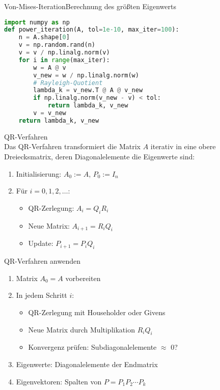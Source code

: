 \begin{example2}{Von-Mises-Iteration}{Berechnung des größten Eigenwerts}
\begin{lstlisting}[language=Python, style=basesmol]
import numpy as np
def power_iteration(A, tol=1e-10, max_iter=100):
    n = A.shape[0]
    v = np.random.rand(n)
    v = v / np.linalg.norm(v)
    for i in range(max_iter):
        w = A @ v
        v_new = w / np.linalg.norm(w)
        # Rayleigh-Quotient
        lambda_k = v_new.T @ A @ v_new
        if np.linalg.norm(v_new - v) < tol:
            return lambda_k, v_new
        v = v_new
    return lambda_k, v_new
\end{lstlisting}
\end{example2}

\begin{concept}{QR-Verfahren}\\
Das QR-Verfahren transformiert die Matrix $A$ iterativ in eine obere Dreiecksmatrix, deren Diagonalelemente die Eigenwerte sind:
\begin{enumerate}
    \item Initialisierung: $A_0 := A$, $P_0 := I_n$
    \item Für $i = 0,1,2,\ldots$:
    \begin{itemize}
        \item QR-Zerlegung: $A_i = Q_iR_i$
        \item Neue Matrix: $A_{i+1} = R_iQ_i$
        \item Update: $P_{i+1} = P_iQ_i$
    \end{itemize}
\end{enumerate}
\end{concept}

\begin{KR}{QR-Verfahren anwenden}
\begin{enumerate}
    \item Matrix $A_0 = A$ vorbereiten
    \item In jedem Schritt $i$:
    \begin{itemize}
        \item QR-Zerlegung mit Householder oder Givens
        \item Neue Matrix durch Multiplikation $R_iQ_i$
        \item Konvergenz prüfen: Subdiagonalelemente $\approx$ 0?
    \end{itemize}
    \item Eigenwerte: Diagonalelemente der Endmatrix
    \item Eigenvektoren: Spalten von $P = P_1P_2\cdots P_k$
\end{enumerate}
\end{KR}

